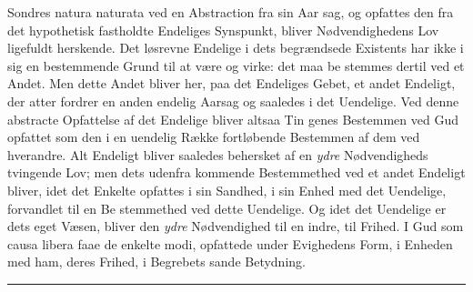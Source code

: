 \documentclass[12pt,a4paper]{book}
\newcommand{\divrule}{\begin{center}\rule{2cm}{0.4pt}\end{center}}
\begin{document}
Sondres natura naturata ved en Abstraction fra sin Aar\-%
sag, og opfattes den fra det hypothetisk fastholdte Endeliges
Synspunkt, bliver Nødvendighedens Lov ligefuldt herskende.
Det løsrevne Endelige i dets begrændsede Existents har ikke i
sig en bestemmende Grund til at være og virke: det maa be\-%
stemmes dertil ved et Andet. Men dette Andet bliver her,
paa det Endeliges Gebet, et andet Endeligt, der atter fordrer
en anden endelig Aarsag og saaledes i det Uendelige. Ved
denne abstracte Opfattelse af det Endelige bliver altsaa Tin\-%
genes Bestemmen ved Gud opfattet som den i en uendelig
Række fortløbende Bestemmen af dem ved hverandre. Alt
Endeligt bliver saaledes behersket af en \emph{ydre} Nødvendigheds
tvingende Lov; men dets udenfra kommende Bestemmethed
ved et andet Endeligt bliver, idet det Enkelte opfattes i sin
Sandhed, i sin Enhed med det Uendelige, forvandlet til en Be\-%
stemmethed ved dette Uendelige. Og idet det Uendelige er
dets eget Væsen, bliver den \emph{ydre} Nødvendighed til en indre,
til Frihed. I Gud som causa libera faae de enkelte modi,
opfattede under Evighedens Form, i Enheden med ham, deres
Frihed, i Begrebets sande Betydning.

\divrule
\end{document}
